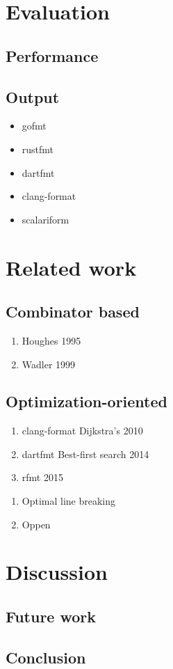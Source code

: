 \documentclass[11pt,a4paper]{article}
\begin{document}
\section{Evaluation}
\subsection{Performance}
\subsection{Output}
\begin{itemize}
  \item gofmt
  \item rustfmt
  \item dartfmt
  \item clang-format
  \item scalariform
\end{itemize}
\section{Related work}
\subsection{Combinator based}
\begin{enumerate}
  \item Houghes 1995
  \item Wadler 1999
\end{enumerate}
\subsection{Optimization-oriented}
\begin{enumerate}
  \item clang-format Dijkstra's 2010
  \item dartfmt Best-first search 2014
  \item rfmt 2015
\end{enumerate}
\begin{enumerate}
  \item Optimal line breaking
  \item Oppen
\end{enumerate}
\section{Discussion}
\subsection{Future work}
\subsection{Conclusion}
\printbibliography{}
\end{document}
